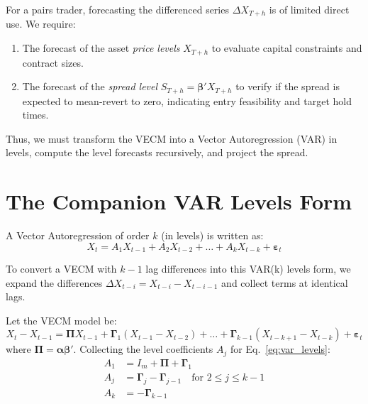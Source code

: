 \documentclass[10pt,a4paper,twocolumn]{article}
\newcommand{\Delt}{\Delta}
\newcommand{\bPi}{\boldsymbol{\Pi}}
\newcommand{\balpha}{\boldsymbol{\alpha}}
\newcommand{\bbeta}{\boldsymbol{\beta}}
\newcommand{\bGamma}{\boldsymbol{\Gamma}}
\newcommand{\beps}{\boldsymbol{\varepsilon}}
\begin{document}
For a pairs trader, forecasting the differenced series $\Delt X_{T+h}$ is of limited direct use. We require:
\begin{enumerate}\setlength\itemsep{0pt}
  \item The forecast of the asset \emph{price levels} $X_{T+h}$ to evaluate capital constraints and contract sizes.
  \item The forecast of the \emph{spread level} $S_{T+h} = \bbeta' X_{T+h}$ to verify if the spread is expected to mean-revert to zero, indicating entry feasibility and target hold times.
\end{enumerate}

Thus, we must transform the VECM into a Vector Autoregression (VAR) in levels, compute the level forecasts recursively, and project the spread.

\section{The Companion VAR Levels Form}

A Vector Autoregression of order $k$ (in levels) is written as:
\begin{equation}
  X_t = A_1 X_{t-1} + A_2 X_{t-2} + \dots + A_k X_{t-k} + \beps_t
  \label{eq:var_levels}
\end{equation}

To convert a VECM with $k-1$ lag differences into this VAR(k) levels form, we expand the differences $\Delt X_{t-i} = X_{t-i} - X_{t-i-1}$ and collect terms at identical lags.

\begin{tcolorbox}[mathbox={VECM to VAR Levels Transformation}]
Let the VECM model be:
\[
  X_t - X_{t-1} = \bPi X_{t-1} + \bGamma_1 (X_{t-1} - X_{t-2}) + \dots + \bGamma_{k-1} (X_{t-k+1} - X_{t-k}) + \beps_t
\]
where $\bPi = \balpha \bbeta'$. Collecting the level coefficients $A_j$ for Eq.~\eqref{eq:var_levels}:
\begin{align}
  A_1 &= I_m + \bPi + \bGamma_1 \label{eq:a1} \\
  A_j &= \bGamma_j - \bGamma_{j-1} \quad \text{for } 2 \le j \le k-1 \label{eq:aj} \\
  A_k &= -\bGamma_{k-1} \label{eq:ak}
\end{align}
\end{tcolorbox}
\end{document}

